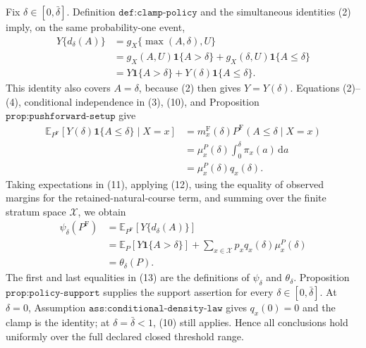 Fix \(\delta\in[0,\bar\delta]\).  Definition \(\texttt{def:clamp-policy}\) and the simultaneous identities (2) imply, on the same probability-one event,
\[
\begin{aligned}
 Y\{d_\delta(A)\}
 &=g_X\{\max(A,\delta),U\}\\
 &=g_X(A,U)\mathbf 1\{A>\delta\}
   +g_X(\delta,U)\mathbf 1\{A\leq\delta\}\\
 &=Y\mathbf 1\{A>\delta\}+Y(\delta)\mathbf 1\{A\leq\delta\}.
\end{aligned}
\tag{11}
\]
This identity also covers \(A=\delta\), because (2) then gives \(Y=Y(\delta)\).  Equations (2)--(4), conditional independence in (3), (10), and Proposition \(\texttt{prop:pushforward-setup}\) give
\[
\begin{aligned}
 \mathbb E_{P^{\mathrm F}}[Y(\delta)\mathbf 1\{A\leq\delta\}\mid X=x]
 &=m_x^{\mathrm F}(\delta)P^{\mathrm F}(A\leq\delta\mid X=x)\\
 &=\mu_x^P(\delta)\int_0^\delta\pi_x(a)\,\mathrm da\\
 &=\mu_x^P(\delta)q_x(\delta).
\end{aligned}
\tag{12}
\]
Taking expectations in (11), applying (12), using the equality of observed margins for the retained-natural-course term, and summing over the finite stratum space \(\mathcal X\), we obtain
\[
\begin{aligned}
 \psi_\delta(P^{\mathrm F})
 &=\mathbb E_{P^{\mathrm F}}[Y\{d_\delta(A)\}]\\
 &=\mathbb E_P[Y\mathbf 1\{A>\delta\}]
   +\sum_{x\in\mathcal X}p_xq_x(\delta)\mu_x^P(\delta)\\
 &=\theta_\delta(P).
\end{aligned}
\tag{13}
\]
The first and last equalities in (13) are the definitions of \(\psi_\delta\) and \(\theta_\delta\).  Proposition \(\texttt{prop:policy-support}\) supplies the support assertion for every \(\delta\in[0,\bar\delta]\).  At \(\delta=0\), Assumption \(\texttt{ass:conditional-density-law}\) gives \(q_x(0)=0\) and the clamp is the identity; at \(\delta=\bar\delta<1\), (10) still applies.  Hence all conclusions hold uniformly over the full declared closed threshold range.
